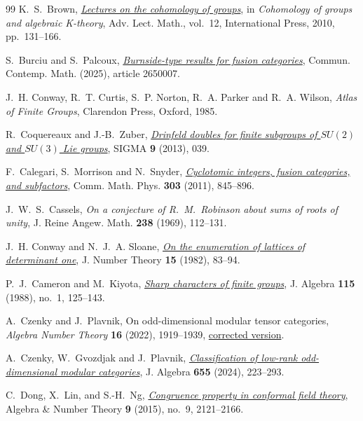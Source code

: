 \documentclass[11pt]{amsart}
\numberwithin{equation}{section}
\theoremstyle{definition}
\theoremstyle{plain}
\begin{document}
\begin{thebibliography}{99}
K.~S.~Brown, \href{https://pi.math.cornell.edu/~kbrown/papers/cohomology_hangzhou.pdf}{\emph{Lectures on the cohomology of groups}},
in \emph{Cohomology of groups and algebraic K-theory},
Adv. Lect. Math., vol.~12, International Press, 2010, pp.~131--166.

S.~Burciu and S.~Palcoux,
\href{https://doi.org/10.1142/S0219199726500070}{\emph{Burnside-type
results for fusion categories}}, Commun. Contemp. Math. (2025), article 2650007.

J.~H. Conway, R.~T. Curtis, S.~P. Norton, R.~A. Parker and
R.~A. Wilson, \emph{Atlas of Finite Groups}, Clarendon Press, Oxford, 1985.

R.~Coquereaux and J.-B.~Zuber,
\href{https://doi.org/10.3842/SIGMA.2013.039}{\emph{Drinfeld doubles for finite subgroups of $SU(2)$ and $SU(3)$ Lie groups}},
SIGMA \textbf{9} (2013), 039.

F.~Calegari, S.~Morrison and N.~Snyder,
\href{https://doi.org/10.1007/s00220-010-1136-2}{\emph{Cyclotomic integers, fusion categories, and subfactors}},
Comm. Math. Phys. \textbf{303} (2011), 845--896.

J.~W.~S.~Cassels, \emph{On a conjecture of R.~M.~Robinson about sums
of roots of unity}, J. Reine Angew. Math. \textbf{238} (1969), 112--131.

J.~H. Conway and N.~J.~A. Sloane,
\href{https://neilsloane.com/doc/Me81.pdf}{\emph{On the enumeration of lattices of determinant one}},
J. Number Theory \textbf{15} (1982), 83--94.

P.~J.~Cameron and M.~Kiyota,
\href{https://doi.org/10.1016/0021-8693(88)90285-2}{\emph{Sharp characters of finite groups}},
J. Algebra \textbf{115} (1988), no.~1, 125--143.

A.~Czenky and J.~Plavnik, On odd-dimensional modular tensor categories,
\emph{Algebra Number Theory} \textbf{16} (2022), 1919--1939,
\href{https://arxiv.org/abs/2007.01477}{corrected version}.

A.~Czenky, W.~Gvozdjak and J.~Plavnik,
\href{https://doi.org/10.1016/j.jalgebra.2023.10.021}{\emph{Classification of low-rank odd-dimensional modular categories}},
J. Algebra \textbf{655} (2024), 223--293.

C.~Dong, X.~Lin, and S.-H.~Ng,
\href{https://doi.org/10.2140/ant.2015.9.2121}{\emph{Congruence property in conformal field theory}},
Algebra \& Number Theory \textbf{9} (2015), no.~9, 2121--2166.


\end{thebibliography}
\end{document}

